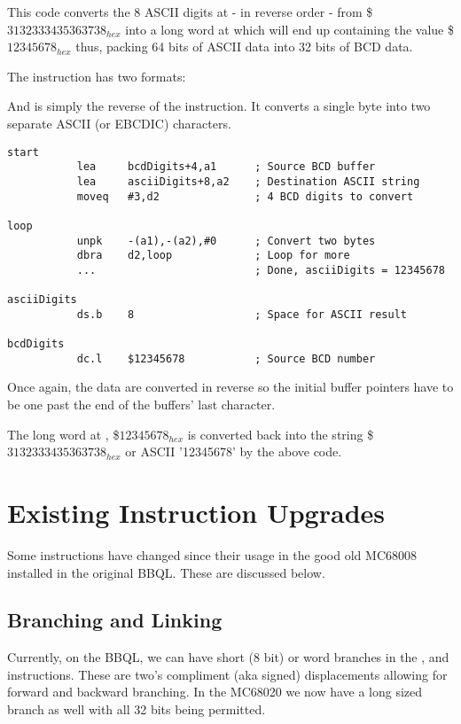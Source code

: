 This code converts the 8 ASCII digits at  - in reverse order - from \$$3132333435363738_{hex}$ into a long word at  which will end up containing the value \$$12345678_{hex}$ thus, packing 64 bits of ASCII data into 32 bits of BCD data.

The  instruction has two formats:


And is simply the reverse of the  instruction. It converts a single byte into two separate ASCII (or EBCDIC) characters.

\begin{lstlisting}[firstnumber=1,caption={Example of the UNPK instruction}]
start
           lea     bcdDigits+4,a1      ; Source BCD buffer
           lea     asciiDigits+8,a2    ; Destination ASCII string
           moveq   #3,d2               ; 4 BCD digits to convert

loop
           unpk    -(a1),-(a2),#0      ; Convert two bytes
           dbra    d2,loop             ; Loop for more
           ...                         ; Done, asciiDigits = 12345678

asciiDigits
           ds.b    8                   ; Space for ASCII result

bcdDigits
           dc.l    $12345678           ; Source BCD number
\end{lstlisting}

Once again, the data are converted in reverse so the initial buffer pointers have to be one past the end of the buffers' last character.

The long word at , \$$12345678_{hex}$ is converted back into the  string \$$3132333435363738_{hex}$ or ASCII '12345678' by the above code.

\section{Existing Instruction Upgrades}

Some instructions have changed since their usage in the good old MC68008 installed in the original BBQL. These are discussed below.

\subsection{Branching and Linking}

Currently, on the BBQL, we can have short (8 bit) or word branches in the ,  and  instructions. These are two's compliment (aka signed) displacements allowing for forward and backward branching. In the MC68020 we now have a long sized branch as well with all 32 bits being permitted.

